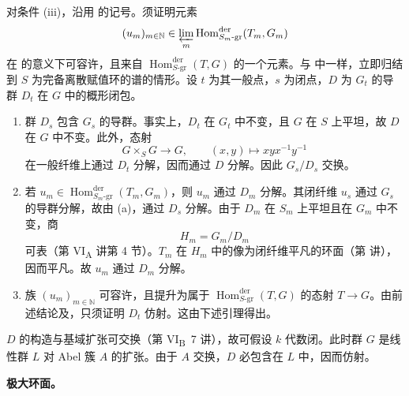 对条件 \textup{(iii)}，沿用 的记号。须证明元素
\[
  (u_m)_{m\in\mathbb N}\in
  \varprojlim_m
  \operatorname{Hom}^{\mathrm{der}}_{S_m\text{-gr}}(T_m,G_m)
\]
在 的意义下可容许，且来自 \(\operatorname{Hom}^{\mathrm{der}}_{S\text{-gr}}(T,G)\) 的一个元素。与  中一样，立即归结到 \(S\) 为完备离散赋值环的谱的情形。设 \(t\) 为其一般点，\(s\) 为闭点，\(D\) 为 \(G_t\) 的导群 \(D_t\) 在 \(G\) 中的概形闭包。

\begin{enumerate}
\renewcommand{\labelenumi}{\textup{\alph{enumi})}}
\item 群 \(D_s\) 包含 \(G_s\) 的导群。事实上，\(D_t\) 在 \(G_t\) 中不变，且 \(G\) 在 \(S\) 上平坦，故 \(D\) 在 \(G\) 中不变。此外，态射
\[
  G\times_S G\longrightarrow G,
  \qquad (x,y)\longmapsto xyx^{-1}y^{-1}
\]
在一般纤维上通过 \(D_t\) 分解，因而通过 \(D\) 分解。因此 \(G_s/D_s\) 交换。

\item 若 \(u_m\in\operatorname{Hom}^{\mathrm{der}}_{S_m\text{-gr}}(T_m,G_m)\)，则 \(u_m\) 通过 \(D_m\) 分解。其闭纤维 \(u_s\) 通过 \(G_s\) 的导群分解，故由 \textup{(a)}，通过 \(D_s\) 分解。由于 \(D_m\) 在 \(S_m\) 上平坦且在 \(G_m\) 中不变，商
\[
  H_m=G_m/D_m
\]
可表（第 VI\textsubscript{A} 讲第 4 节）。\(T_m\) 在 \(H_m\) 中的像为闭纤维平凡的环面（第  讲），因而平凡。故 \(u_m\) 通过 \(D_m\) 分解。

\item 族 \((u_m)_{m\in\mathbb N}\) 可容许，且提升为属于 \(\operatorname{Hom}^{\mathrm{der}}_{S\text{-gr}}(T,G)\) 的态射 \(T\to G\)。由前述结论及，只须证明 \(D_t\) 仿射。这由下述引理得出。
\end{enumerate}


\(D\) 的构造与基域扩张可交换（第 VI\textsubscript{B}~7 讲），故可假设 \(k\) 代数闭。此时群 \(G\) 是线性群 \(L\) 对 Abel 簇 \(A\) 的扩张。由于 \(A\) 交换，\(D\) 必包含在 \(L\) 中，因而仿射。

\medskip\noindent\textbf{极大环面。}

